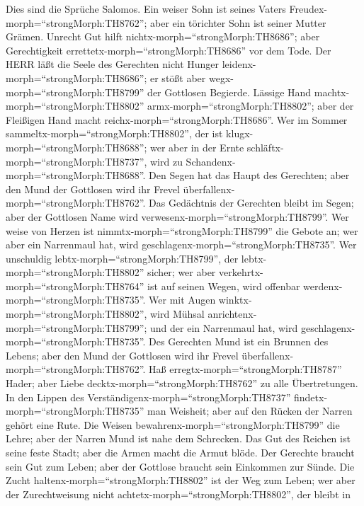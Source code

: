  Dies sind die Sprüche Salomos. Ein weiser Sohn ist seines
Vaters Freudex-morph=``strongMorph:TH8762''; aber ein törichter Sohn ist
seiner Mutter Grämen.  Unrecht Gut hilft
nichtx-morph=``strongMorph:TH8686''; aber Gerechtigkeit
errettetx-morph=``strongMorph:TH8686'' vor dem Tode.  Der
HERR läßt die Seele des Gerechten nicht Hunger
leidenx-morph=``strongMorph:TH8686''; er stößt aber
wegx-morph=``strongMorph:TH8799'' der Gottlosen Begierde. 
Lässige Hand machtx-morph=``strongMorph:TH8802''
armx-morph=``strongMorph:TH8802''; aber der Fleißigen Hand macht
reichx-morph=``strongMorph:TH8686''.  Wer im Sommer
sammeltx-morph=``strongMorph:TH8802'', der ist
klugx-morph=``strongMorph:TH8688''; wer aber in der Ernte
schläftx-morph=``strongMorph:TH8737'', wird zu
Schandenx-morph=``strongMorph:TH8688''.  Den Segen hat das
Haupt des Gerechten; aber den Mund der Gottlosen wird ihr Frevel
überfallenx-morph=``strongMorph:TH8762''.  Das Gedächtnis
der Gerechten bleibt im Segen; aber der Gottlosen Name wird
verwesenx-morph=``strongMorph:TH8799''.  Wer weise von
Herzen ist nimmtx-morph=``strongMorph:TH8799'' die Gebote an; wer aber
ein Narrenmaul hat, wird geschlagenx-morph=``strongMorph:TH8735''.
 Wer unschuldig lebtx-morph=``strongMorph:TH8799'', der
lebtx-morph=``strongMorph:TH8802'' sicher; wer aber
verkehrtx-morph=``strongMorph:TH8764'' ist auf seinen Wegen, wird
offenbar werdenx-morph=``strongMorph:TH8735''.  Wer mit
Augen winktx-morph=``strongMorph:TH8802'', wird Mühsal
anrichtenx-morph=``strongMorph:TH8799''; und der ein Narrenmaul hat,
wird geschlagenx-morph=``strongMorph:TH8735''.  Des
Gerechten Mund ist ein Brunnen des Lebens; aber den Mund der Gottlosen
wird ihr Frevel überfallenx-morph=``strongMorph:TH8762''. 
Haß erregtx-morph=``strongMorph:TH8787'' Hader; aber Liebe
decktx-morph=``strongMorph:TH8762'' zu alle Übertretungen. 
In den Lippen des Verständigenx-morph=``strongMorph:TH8737''
findetx-morph=``strongMorph:TH8735'' man Weisheit; aber auf den Rücken
der Narren gehört eine Rute.  Die Weisen
bewahrenx-morph=``strongMorph:TH8799'' die Lehre; aber der Narren Mund
ist nahe dem Schrecken.  Das Gut des Reichen ist seine
feste Stadt; aber die Armen macht die Armut blöde.  Der
Gerechte braucht sein Gut zum Leben; aber der Gottlose braucht sein
Einkommen zur Sünde.  Die Zucht
haltenx-morph=``strongMorph:TH8802'' ist der Weg zum Leben; wer aber der
Zurechtweisung nicht achtetx-morph=``strongMorph:TH8802'', der bleibt in
